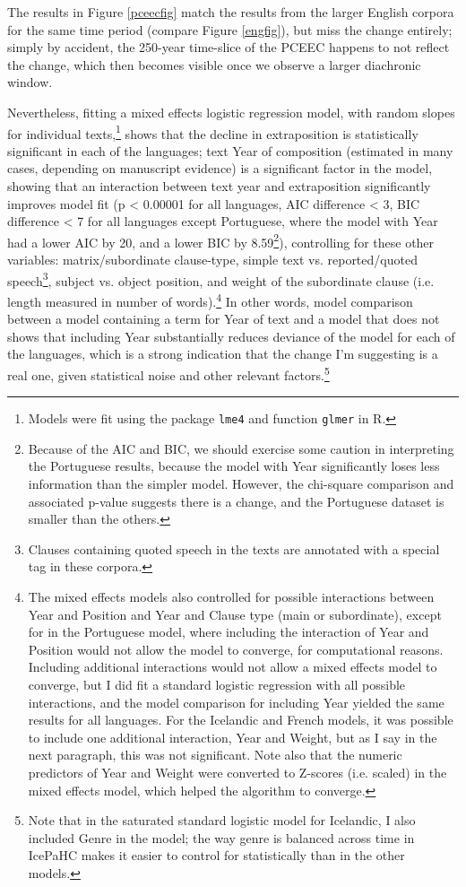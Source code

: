 \noindent The results in Figure \ref{pceecfig} match the results from the larger English corpora for the same time period (compare Figure \ref{engfig}), but miss the change entirely; simply by accident, the 250-year time-slice of the PCEEC happens to not reflect the change, which then becomes visible once we observe a larger diachronic window.

Nevertheless, fitting a mixed effects logistic regression model, with random slopes for individual texts,\footnote{Models were fit using the package \texttt{lme4} and function \texttt{glmer} in R.} shows that the decline in extraposition is statistically significant in each of the languages; text Year of composition (estimated in many cases, depending on manuscript evidence) is a significant factor in the model, showing that an interaction between text year and extraposition significantly improves model fit (p < 0.00001 for all languages, AIC difference < 3, BIC difference < 7 for all languages except Portuguese, where the model with Year had a lower AIC by 20, and a lower BIC by 8.59\footnote{Because of the AIC and BIC, we should exercise some caution in interpreting the Portuguese results, because the model with Year significantly loses less information than the simpler model. However, the chi-square comparison and associated p-value suggests there is a change, and the Portuguese dataset is smaller than the others.}), controlling for these other variables: matrix/subordinate clause-type, simple text vs. reported/quoted speech\footnote{Clauses containing quoted speech in the texts are annotated with a special tag in these corpora.}, subject vs. object position, and weight of the subordinate clause (i.e. length measured in number of words).\footnote{The mixed effects models also controlled for possible interactions between Year and Position and Year and Clause type (main or subordinate), except for in the Portuguese model, where including the interaction of Year and Position would not allow the model to converge, for computational reasons. Including additional interactions would not allow a mixed effects model to converge, but I did fit a standard logistic regression with all possible interactions, and the model comparison for including Year yielded the same results for all languages. For the Icelandic and French models, it was possible to include one additional interaction, Year and Weight, but as I say in the next paragraph, this was not significant. Note also that the numeric predictors of Year and Weight were converted to Z-scores (i.e. scaled) in the mixed effects model, which helped the algorithm to converge.} In other words, model comparison between a model containing a term for Year of text and a model that does not shows that including Year substantially reduces deviance of the model for each of the languages, which is a strong indication that the change I'm suggesting is a real one, given statistical noise and other relevant factors.\footnote{Note that in the saturated standard logistic model for Icelandic, I also included Genre in the model; the way genre is balanced across time in IcePaHC makes it easier to control for statistically than in the other models.}

